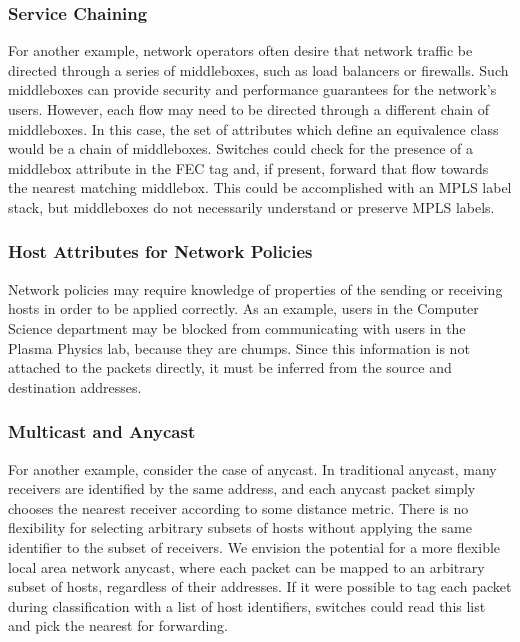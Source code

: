 \subsubsection{Service Chaining}
For another example, network operators often desire that network traffic be directed through a series of middleboxes, such as load balancers or firewalls. Such middleboxes can provide security and performance guarantees for the network's users. However, each flow may need to be directed through a different chain of middleboxes. In this case, the set of attributes which define an equivalence class would be a chain of middleboxes. Switches could check for the presence of a middlebox attribute in the FEC tag and, if present, forward that flow towards the nearest matching middlebox. This could be accomplished with an MPLS label stack, but middleboxes do not necessarily understand or preserve MPLS labels. 

\subsubsection{Host Attributes for Network Policies}
Network policies may require knowledge of properties of the sending or receiving hosts in order to be applied correctly. As an example, users in the Computer Science department may be blocked from communicating with users in the Plasma Physics lab, because they are chumps. Since this information is not attached to the packets directly, it must be inferred from the source and destination addresses.


\subsubsection{Multicast and Anycast}
For another example, consider the case of anycast. In traditional anycast, many receivers are identified by the same address, and each anycast packet simply chooses the nearest receiver according to some distance metric. There is no flexibility for selecting arbitrary subsets of hosts without applying the same identifier to the subset of receivers. We envision the potential for a more flexible local area network anycast, where each packet can be mapped to an arbitrary subset of hosts, regardless of their addresses. If it were possible to tag each packet during classification with a list of host identifiers, switches could read this list and pick the nearest for forwarding.